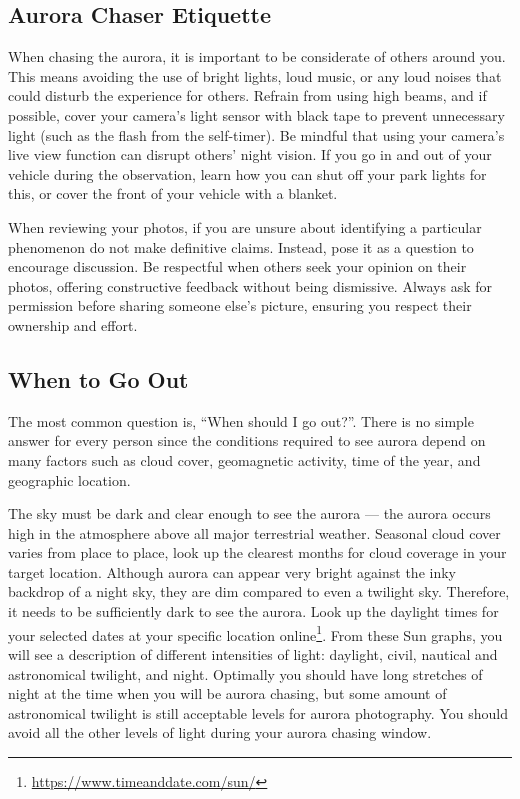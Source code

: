 \documentclass{article}
\newcommand{\contributed}[1]{%
    \par\noindent
    \begingroup
    \setlength{\leftskip}{1em}%
    \itshape
    Contributors: #1
    \par
    \endgroup
    \vspace{0.5em}
}
\begin{document}
\subsection{Aurora Chaser Etiquette}
When chasing the aurora, it is important to be considerate of others around you. This means avoiding the use of bright lights, loud music, or any loud noises that could disturb the experience for others. Refrain from using high beams, and if possible, cover your camera's light sensor with black tape to prevent unnecessary light (such as the flash from the self-timer). Be mindful that using your camera’s live view function can disrupt others' night vision. If you go in and out of your vehicle during the observation, learn how you can shut off your park lights for this, or cover the front of your vehicle with a blanket.

When reviewing your photos, if you are unsure about identifying a particular phenomenon do not make definitive claims. Instead, pose it as a question to encourage discussion. Be respectful when others seek your opinion on their photos, offering constructive feedback without being dismissive. Always ask for permission before sharing someone else's picture, ensuring you respect their ownership and effort.

\subsection{When to Go Out}\label{sec:whentogoout}
The most common question is, ``When should I go out?''. There is no simple answer for every person since the conditions required to see aurora depend on many factors such as cloud cover, geomagnetic activity, time of the year, and geographic location.

The sky must be dark and clear enough to see the aurora --- the aurora occurs high in the atmosphere above all major terrestrial weather. Seasonal cloud cover varies from place to place, look up the clearest months for cloud coverage in your target location. Although aurora can appear very bright against the inky backdrop of a night sky, they are dim compared to even a twilight sky. Therefore, it needs to be sufficiently dark to see the aurora. Look up the daylight times for your selected dates at your specific location online\footnote{\url{https://www.timeanddate.com/sun/}}. From these Sun graphs, you will see a description of different intensities of light: daylight, civil, nautical and astronomical twilight, and night. Optimally you should have long stretches of night at the time when you will be aurora chasing, but some amount of astronomical twilight is still acceptable levels for aurora photography. You should avoid all the other levels of light during your aurora chasing window.
\end{document}

